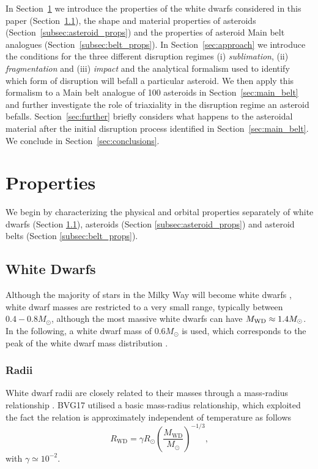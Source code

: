 \documentclass[fleqn,usenatbib]{mnras}
\begin{document}
In Section~\ref{sec:properties} we introduce the properties of the white dwarfs considered in this paper (Section~\ref{subsec:wd}), the shape and material properties of asteroids (Section~\ref{subsec:asteroid_props}) and the properties of asteroid Main belt analogues (Section~\ref{subsec:belt_props}).
In Section~\ref{sec:approach} we introduce the conditions for the three different disruption regimes (i) \textit{sublimation}, (ii) \textit{fragmentation} and (iii) \textit{impact} and the analytical formalism used to identify which form of disruption will befall a particular asteroid.
We then apply this formalism to a Main belt analogue of 100 asteroids in Section~\ref{sec:main_belt} and further investigate the role of triaxiality in the disruption regime an asteroid befalls. 
Section~\ref{sec:further} briefly considers what happens to the asteroidal material after the initial disruption process identified in Section~\ref{sec:main_belt}. We conclude in Section~\ref{sec:conclusions}.

\section{Properties} \label{sec:properties}

We begin by characterizing the physical and orbital properties separately of white dwarfs (Section \ref{subsec:wd}), asteroids (Section \ref{subsec:asteroid_props}) and asteroid belts (Section \ref{subsec:belt_props}).

\subsection{White Dwarfs} \label{subsec:wd}
Although the majority of stars in the Milky Way will become white dwarfs \citep{Koester2013}, white dwarf masses are restricted to a very small range, typically between $0.4-0.8 M_\odot$, although the most massive white dwarfs can have $M_{\rm WD} \approx 1.4 M_\odot$. In the following, a white dwarf mass of $0.6M_\odot$ is used, which corresponds to the peak of the white dwarf mass distribution \citep{Althaus2010, Kleinman2013, Tremblay2016, McCleery2020}.

\subsubsection{Radii} \label{subsubsec:wdmass_rad}

White dwarf radii are closely related to their masses through a mass-radius relationship \citep{Hamada1961}.
BVG17 utilised a basic mass-radius relationship, which exploited the fact the relation is approximately independent of temperature as follows
\begin{equation}
    R_\text{WD} = \gamma R_\odot \left( \frac{M_\text{WD}}{M_\odot} \right)^{-1/3},
    \label{eq:mass-radius_BVG}
\end{equation}
with $\gamma \simeq 10^{-2}$. 
\end{document}
